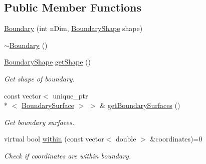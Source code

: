 \subsection*{Public Member Functions}
\begin{DoxyCompactItemize}
\item 
\hyperlink{classBoundary_ac6eb3bf752b27d4d799c4d2691b312ce}{Boundary} (int n\+Dim, \hyperlink{Boundary_8h_a0099b369f2bc119c1b54728734b41132}{Boundary\+Shape} shape)
\item 
\hyperlink{classBoundary_a86eab4f2362618c5b1e3d0df3a5f7f42}{$\sim$\+Boundary} ()
\item 
\hyperlink{Boundary_8h_a0099b369f2bc119c1b54728734b41132}{Boundary\+Shape} \hyperlink{classBoundary_a20d2121527b207eed35f6719393e3499}{get\+Shape} ()
\begin{DoxyCompactList}\small\item\em Get shape of boundary. \end{DoxyCompactList}\item 
const vector$<$ unique\+\_\+ptr\\*
$<$ \hyperlink{classBoundarySurface}{Boundary\+Surface} $>$ $>$ \& \hyperlink{classBoundary_acfa6640f65c432e339108887913539eb}{get\+Boundary\+Surfaces} ()
\begin{DoxyCompactList}\small\item\em Get boundary surfaces. \end{DoxyCompactList}\item 
virtual bool \hyperlink{classBoundary_aef1af10ace9eae30e86b6bd23087b3ff}{within} (const vector$<$ double $>$ \&coordinates)=0
\begin{DoxyCompactList}\small\item\em Check if coordinates are within boundary. \end{DoxyCompactList}\end{DoxyCompactItemize}
